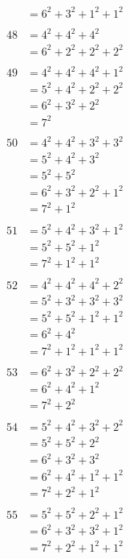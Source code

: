 \documentclass{article}
\numberwithin{equation}{section}
\begin{document}
\begin{multicols}{3}
\begin{align*}
   & = 6^2 + 3^2 + 1^2 + 1^2\\
\\
48 & = 4^2 + 4^2 + 4^2\\
   & = 6^2 + 2^2 + 2^2 + 2^2\\
\\
49 & = 4^2 + 4^2 + 4^2 + 1^2\\
   & = 5^2 + 4^2 + 2^2 + 2^2\\
   & = 6^2 + 3^2 + 2^2\\
   & = 7^2\\
\\
50 & = 4^2 + 4^2 + 3^2 + 3^2\\
   & = 5^2 + 4^2 + 3^2\\
   & = 5^2 + 5^2\\
   & = 6^2 + 3^2 + 2^2 + 1^2\\
   & = 7^2 + 1^2\\
\\
51 & = 5^2 + 4^2 + 3^2 + 1^2\\
   & = 5^2 + 5^2 + 1^2\\
   & = 7^2 + 1^2 + 1^2\\
\\
52 & = 4^2 + 4^2 + 4^2 + 2^2\\
   & = 5^2 + 3^2 + 3^2 + 3^2\\
   & = 5^2 + 5^2 + 1^2 + 1^2\\
   & = 6^2 + 4^2\\
   & = 7^2 + 1^2 + 1^2 + 1^2\\
\\
53 & = 6^2 + 3^2 + 2^2 + 2^2\\
   & = 6^2 + 4^2 + 1^2\\
   & = 7^2 + 2^2\\
\end{align*}
\vspace{\fill}\columnbreak
\begin{align*}
54 & = 5^2 + 4^2 + 3^2 + 2^2\\
   & = 5^2 + 5^2 + 2^2\\
   & = 6^2 + 3^2 + 3^2\\
   & = 6^2 + 4^2 + 1^2 + 1^2\\
   & = 7^2 + 2^2 + 1^2\\
\\
55 & = 5^2 + 5^2 + 2^2 + 1^2\\
   & = 6^2 + 3^2 + 3^2 + 1^2\\
   & = 7^2 + 2^2 + 1^2 + 1^2\\
\\

\end{align*}
\end{multicols}
\end{document}
